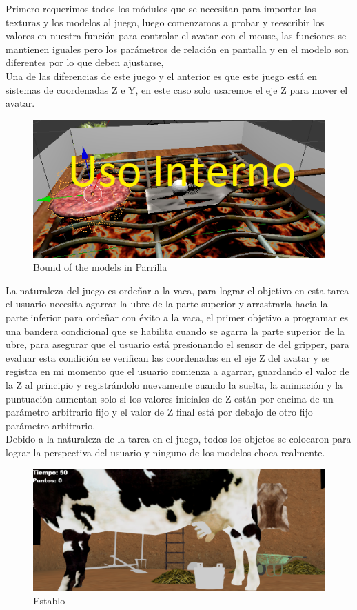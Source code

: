 \documentclass{article}
\begin{document}
Primero requerimos todos los módulos que se necesitan para importar las texturas y los modelos al juego, luego comenzamos a probar y reescribir los valores en nuestra función para controlar el avatar con el mouse, las funciones se mantienen iguales pero los parámetros de relación en pantalla y en el modelo son diferentes por lo que deben ajustarse,
\\
Una de las diferencias de este juego y el anterior es que este juego está en sistemas de coordenadas Z e Y, en este caso solo usaremos el eje Z para mover el avatar.
\\
\begin{figure}[h]
    \centering
    \includegraphics[scale=1]{bound_parrilla.png}
    \caption{Bound of the models in Parrilla}
    \label{Bounds}
\end{figure}
La naturaleza del juego es ordeñar a la vaca, para lograr el objetivo en esta tarea el usuario necesita agarrar la ubre de la parte superior y arrastrarla hacia la parte inferior para ordeñar con éxito a la vaca, el primer objetivo a programar es una bandera condicional que se habilita cuando se agarra la parte superior de la ubre, para asegurar que el usuario está presionando el sensor de del gripper, para evaluar esta condición se verifican las coordenadas en el eje Z del avatar y se registra en mi momento que el usuario comienza a agarrar, guardando el valor de la Z al principio y registrándolo nuevamente cuando la suelta, la animación y la puntuación aumentan solo si los valores iniciales de Z están por encima de un parámetro arbitrario fijo y el valor de Z final está por debajo de otro fijo parámetro arbitrario. \\
Debido a la naturaleza de la tarea en el juego, todos los objetos se colocaron  para lograr la perspectiva del usuario y ninguno de los modelos choca realmente.
\begin{figure}[h]
    \centering
    \includegraphics[scale=0.35]{establo.png}
    \caption{Establo}
    \label{Establo}
\end{figure}
\end{document}
